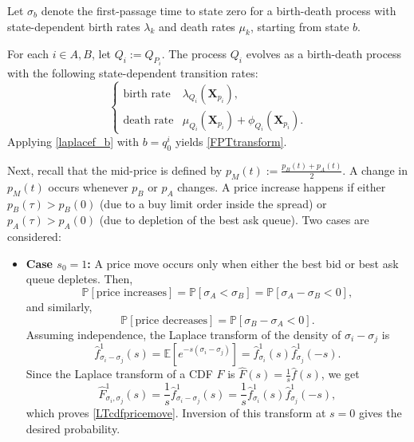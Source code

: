 \documentclass[11pt]{article}
\newenvironment{proof}{\noindent{\it Proof.}}{\hfill\fbox{}\vspace*{1mm}}
\begin{document}
\begin{proof}
Let $\sigma_b$ denote the first-passage time to state zero for a birth-death process with state-dependent birth rates $\lambda_k$ and death rates $\mu_k$, starting from state $b$.

For each $i \in {A, B}$, let $Q_i := Q_{P_i}$. The process $Q_i$ evolves as a birth-death process with the following state-dependent transition rates:
\begin{equation}\label{birthdeathrates}
\begin{cases}
\text{birth rate} & \lambda_{Q_i}(\boldsymbol{X}_{p_i}), \\
\text{death rate} & \mu_{Q_i}(\boldsymbol{X}_{p_i}) + \phi_{Q_i}(\boldsymbol{X}_{p_i}).
\end{cases}
\end{equation}
Applying \eqref{laplacef_b} with $b = q_0^i$ yields \eqref{FPTtransform}.

Next, recall that the mid-price is defined by
$
p_M(t) := \frac{p_B(t) + p_A(t)}{2}.
$
A change in $p_M(t)$ occurs whenever $p_B$ or $p_A$ changes. A price increase happens if either $p_B(\tau) > p_B(0)$ (due to a buy limit order inside the spread) or $p_A(\tau) > p_A(0)$ (due to depletion of the best ask queue). Two cases are considered:
\begin{itemize}
\item[\textbf{(i)}] \textbf{Case \( s_0 = 1 \):}
A price move occurs only when either the best bid or best ask queue depletes. Then,
\[
\mathbb{P}[\text{price increases}] = \mathbb{P}[\sigma_A < \sigma_B] = \mathbb{P}[\sigma_A - \sigma_B < 0],
\]
and similarly,
\[
\mathbb{P}[\text{price decreases}] = \mathbb{P}[\sigma_B - \sigma_A < 0].
\]
Assuming independence, the Laplace transform of the density of $\sigma_i - \sigma_j$ is
\begin{equation}\label{pricepdf}
\hat{f}^{1}_{\sigma_i - \sigma_j}(s) = \mathbb{E}[e^{-s(\sigma_i - \sigma_j)}] = \hat{f}^{1}_{\sigma_i}(s) \hat{f}^{1}_{\sigma_j}(-s).
\end{equation}
Since the Laplace transform of a CDF $F$ is $\hat{F}(s) = \frac{1}{s} \hat{f}(s)$, we get
\begin{equation}
 \hat{F}_{\sigma_i,\sigma_j}^1(s)=\frac{1}{s}\hat{f}^1_{\sigma_i-\sigma_j}(s)=\frac{1}{s}\hat{f}_{\sigma_i}^1(s)\hat{f}_{\sigma_j}^1(-s),
\end{equation}
which proves \eqref{LTcdfpricemove}. Inversion of this transform at $s=0$ gives the desired probability.


\end{itemize}
\end{proof}
\end{document}
